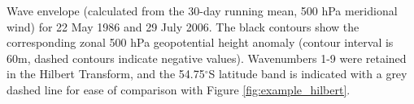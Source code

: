 \label{fig:example_envelope}
Wave envelope (calculated from the 30-day running mean, 500 hPa meridional wind) for 22 May 1986 and 29 July 2006. The black contours show the corresponding zonal 500 hPa geopotential height anomaly (contour interval is 60m, dashed contours indicate negative values). Wavenumbers 1-9 were retained in the Hilbert Transform, and the 54.75$^{\circ}$S latitude band is indicated with a grey dashed line for ease of comparison with Figure \ref{fig:example_hilbert}. 